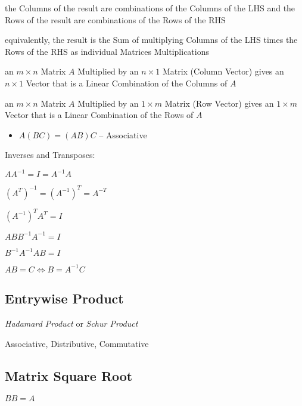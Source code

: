 the Columns of the result are combinations of the Columns of the LHS and the
Rows of the result are combinations of the Rows of the RHS

equivalently, the result is the Sum of multiplying Columns of the LHS times the
Rows of the RHS as individual Matrices Multiplications

an $m \times n$ Matrix $A$ Multiplied by an $n \times 1$ Matrix (Column Vector)
gives an $n \times 1$ Vector that is a Linear Combination of the Columns of $A$

an $m \times n$ Matrix $A$ Multiplied by an $1 \times m$ Matrix (Row Vector)
gives an $1 \times m$ Vector that is a Linear Combination of the Rows of $A$

\begin{itemize}
  \item $A(BC) = (AB)C$ -- Associative
\end{itemize}

Inverses and Transposes:

$AA^{-1} = I = A^{-1}A$

$(A^T)^{-1} = (A^{-1})^T = A^{-T}$

$(A^{-1})^T A^T = I$

$ABB^{-1}A^{-1} = I$

$B^{-1}A^{-1}AB = I$

$AB = C \Leftrightarrow B = A^{-1}C$



\subsection{Entrywise Product}\label{sec:entrywise_product}

\emph{Hadamard Product} or \emph{Schur Product}

Associative, Distributive, Commutative



\subsection{Matrix Square Root}\label{sec:matrix_square_root}

$BB = A$

